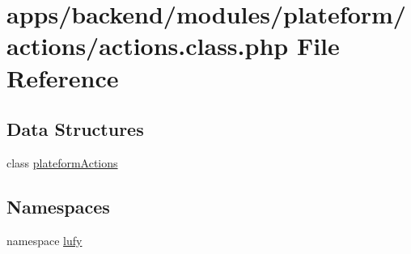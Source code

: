 \hypertarget{backend_2modules_2plateform_2actions_2actions_8class_8php}{\section{apps/backend/modules/plateform/actions/actions.class.\-php File Reference}
\label{backend_2modules_2plateform_2actions_2actions_8class_8php}
}
\subsection*{Data Structures}
\begin{DoxyCompactItemize}
\item 
class \hyperlink{classplateform_actions}{plateform\-Actions}
\end{DoxyCompactItemize}
\subsection*{Namespaces}
\begin{DoxyCompactItemize}
\item 
namespace \hyperlink{namespacelufy}{lufy}
\end{DoxyCompactItemize}
